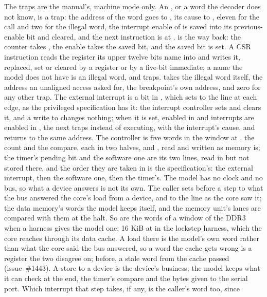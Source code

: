 \documentclass[journal,onecolumn,9pt]{IEEEtran}
\begin{document}
The traps are the manual's, machine mode only. An , or a
word the decoder does not know, is a trap: the address of the word
goes to , its cause to , eleven for the
call and two for the illegal word, the interrupt enable of
 is saved into its previous-enable bit and cleared,
and the next instruction is at .  is the
way back: the counter takes , the enable takes the saved
bit, and the saved bit is set. A CSR instruction reads the register
its upper twelve bits name into  and writes it, replaced,
set or cleared by a register or by a five-bit immediate; a name the
model does not have is an illegal word, and traps. 
takes the illegal word itself, the address an unaligned access asked
for, the breakpoint's own address, and zero for any other trap. The
external interrupt is a bit in , which  sets
to the line at each edge, as the privileged specification has it: the
interrupt controller sets and clears it, and a write to 
changes nothing; when it is set,
enabled in  and interrupts are enabled in
, the next  traps instead of executing,
with the interrupt's cause, and returns to the same address. The
controller is five words in the window at , the
count and the compare, each in two halves, and , read and
written as memory is; the timer's pending bit and the software one
are its two lines, read in  but not stored there, and the
order they are taken in is the specification's: the external
interrupt, then the software one, then the timer's. The model has no
clock and no bus, so what a device answers is not its own. The caller
sets  before a step to what the bus answered the
core's load from a device, and  to the line as the core
saw it; the data memory's words the model keeps itself, and the
memory unit's lanes are compared with them at the halt. So are the
words of a window of the DDR3 when a harness gives the model one: 16
KiB at  in the lockstep harness, which the core
reaches through its data cache. A load there is the model's own word
rather than what the core said the bus answered, so a word the cache
gets wrong is a register the two disagree on; before, a stale word
from the cache passed (issue~\#1443). A store to a
device is the device's business; the model keeps what it can check
at the end, the timer's compare and the bytes given to the serial
port. Which
interrupt that step takes, if any, is the caller's word too, since
\end{document}
